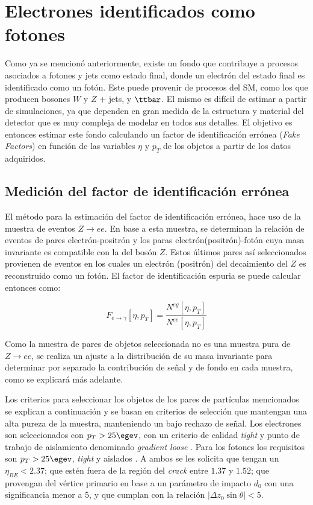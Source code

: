\chapter{Electrones identificados como fotones}\label{ch:e_fake}


Como ya se mencionó anteriormente, existe un fondo que contribuye a procesos asociados a fotones y jets como estado final, donde un electrón del estado final es identificado como un fotón. Este puede provenir de procesos del SM, como los que producen bosones $W$ y $Z$ + jets, y $\ttbar$. El mismo es difícil de estimar a partir de simulaciones, ya que dependen en gran medida de la estructura y material del detector que es muy compleja de modelar en todos sus detalles. El objetivo es entonces estimar este fondo calculando un factor de identificación errónea (\textit{Fake Factors}) en función de las variables $\eta$ y $p_{T}$ de los objetos a partir de los datos adquiridos.

\section{Medición del factor de identificación errónea}

El método para la estimación del factor de identificación errónea, hace uso de la muestra de eventos $Z\rightarrow ee$. En base a esta muestra, se determinan la relación de eventos de pares electrón-positrón y los paras electrón(positrón)-fotón cuya masa invariante es compatible con la del bosón $Z$. Estos últimos pares así seleccionados provienen de eventos en los cuales un electrón (positrón) del decaimiento del $Z$ es reconstruido como un fotón. El factor de identificación espuria se puede calcular entonces como: 

\begin{equation}
F_{e\rightarrow\gamma}[\eta , p_{T}]=\frac{N^{eg}[\eta , p_{T}]}{N^{ee}[\eta , p_{T}]} \label{eq:ff_ratio}
\end{equation}

Como la muestra de pares de objetos seleccionada no es una muestra pura de $Z\rightarrow ee$, se realiza un ajuste a la distribución de su masa invariante para determinar por separado la contribución de señal y de fondo en cada muestra, como se explicará más adelante. 

Los criterios para seleccionar los objetos de los pares de partículas mencionados se explican a continuación y se basan en criterios de selección que mantengan una alta pureza de la muestra, manteniendo un bajo rechazo de señal.
Los electrones  son seleccionados con $p_{T} > 25 \egev$, con un criterio de calidad \textit{tight} y punto de trabajo de aislamiento denominado \textit{gradient loose} \cite{ATLAS-CONF-2016-024}. Para los fotones los requisitos son $p_{T} > 25 \egev$, \textit{tight} y aislados \cite{STDM-2010-08}. A ambos se les solicita que tengan un $\eta_{BE}<2.37$; que estén fuera de la región del \textit{crack} entre $1.37$ y $1.52$; que provengan del vértice primario en base a un parámetro de impacto $d_{0}$ con una significancia menor a 5, y que cumplan con la relación $|\Delta z_{0}\sin\theta|<5$.

